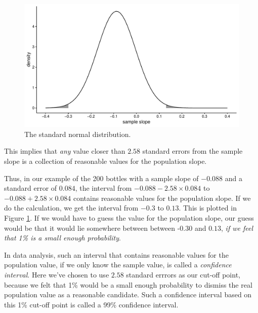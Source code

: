 \documentclass[]{book}\usepackage[]{graphicx}\usepackage[]{color}
\makeatletter
\def\maxwidth{ %
  \ifdim\Gin@nat@width>\linewidth
    \linewidth
  \else
    \Gin@nat@width
  \fi
}
\newenvironment{knitrout}{}{} %
\makeatother
\begin{document}
\begin{knitrout}
\color{fgcolor}\begin{figure}

{\centering \includegraphics[width=\maxwidth]{figure/normal_2z2-1} 

}

\caption[The standard normal distribution]{The standard normal distribution.}\label{fig:normal_2z2}
\end{figure}


\end{knitrout}

This implies that \textit{any} value closer than $2.58$ standard errors from the sample slope is a collection of reasonable values for the population slope.

Thus, in our example of the 200 bottles with a sample slope of $-0.088$ and a standard error of $0.084$, the interval from $-0.088- 2.58 \times 0.084$ to $-0.088+ 2.58 \times 0.084$ contains reasonable values for the population slope. If we do the calculation, we get the interval from $-0.3$ to $0.13$. This is plotted in Figure \ref{fig:normal_2z2}. If we would have to guess the value for the population slope, our guess would be that it would lie somewhere between between -0.30 and $0.13$, \textit{if we feel that 1\% is a small enough probability}.

In data analysis, such an interval that contains reasonable values for the population value, if we only know the sample value, is called a \textit{confidence interval}. Here we've chosen to use $2.58$ standard errrors as our cut-off point, because we felt that 1\% would be a small enough probability to dismiss the real population value as a reasonable candidate. Such a confidence interval based on this 1\% cut-off point is called a 99\% confidence interval.
\end{document}
